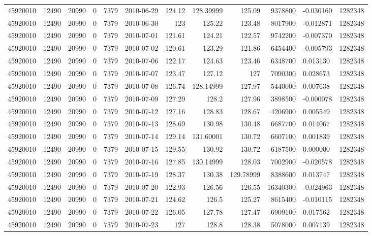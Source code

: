 \begin{tabular}{l | r | r | r | r | l | r | r | r | r | l | r}
45920010 & 12490 & 20990 & 0 & 7379 & 2010-06-29 & 124.12 & 128.39999 & 125.09 & 9378800 & -0.030160 & 1282348 \\
45920010 & 12490 & 20990 & 0 & 7379 & 2010-06-30 & 123 & 125.22 & 123.48 & 8017900 & -0.012871 & 1282348 \\
45920010 & 12490 & 20990 & 0 & 7379 & 2010-07-01 & 121.61 & 124.21 & 122.57 & 9742200 & -0.007370 & 1282348 \\
45920010 & 12490 & 20990 & 0 & 7379 & 2010-07-02 & 120.61 & 123.29 & 121.86 & 6454400 & -0.005793 & 1282348 \\
45920010 & 12490 & 20990 & 0 & 7379 & 2010-07-06 & 122.17 & 124.63 & 123.46 & 6348700 & 0.013130 & 1282348 \\
45920010 & 12490 & 20990 & 0 & 7379 & 2010-07-07 & 123.47 & 127.12 & 127 & 7090300 & 0.028673 & 1282348 \\
45920010 & 12490 & 20990 & 0 & 7379 & 2010-07-08 & 126.74 & 128.14999 & 127.97 & 5440000 & 0.007638 & 1282348 \\
45920010 & 12490 & 20990 & 0 & 7379 & 2010-07-09 & 127.29 & 128.2 & 127.96 & 3898500 & -0.000078 & 1282348 \\
45920010 & 12490 & 20990 & 0 & 7379 & 2010-07-12 & 127.16 & 128.83 & 128.67 & 4206900 & 0.005549 & 1282348 \\
45920010 & 12490 & 20990 & 0 & 7379 & 2010-07-13 & 128.69 & 130.98 & 130.48 & 6687700 & 0.014067 & 1282348 \\
45920010 & 12490 & 20990 & 0 & 7379 & 2010-07-14 & 129.14 & 131.60001 & 130.72 & 6607100 & 0.001839 & 1282348 \\
45920010 & 12490 & 20990 & 0 & 7379 & 2010-07-15 & 129.55 & 130.92 & 130.72 & 6187500 & 0.000000 & 1282348 \\
45920010 & 12490 & 20990 & 0 & 7379 & 2010-07-16 & 127.85 & 130.14999 & 128.03 & 7002900 & -0.020578 & 1282348 \\
45920010 & 12490 & 20990 & 0 & 7379 & 2010-07-19 & 128.37 & 130.38 & 129.78999 & 8388600 & 0.013747 & 1282348 \\
45920010 & 12490 & 20990 & 0 & 7379 & 2010-07-20 & 122.93 & 126.56 & 126.55 & 16340300 & -0.024963 & 1282348 \\
45920010 & 12490 & 20990 & 0 & 7379 & 2010-07-21 & 124.62 & 126.5 & 125.27 & 8615400 & -0.010115 & 1282348 \\
45920010 & 12490 & 20990 & 0 & 7379 & 2010-07-22 & 126.05 & 127.78 & 127.47 & 6909100 & 0.017562 & 1282348 \\
45920010 & 12490 & 20990 & 0 & 7379 & 2010-07-23 & 127 & 128.8 & 128.38 & 5078000 & 0.007139 & 1282348 \\

\end{tabular}
